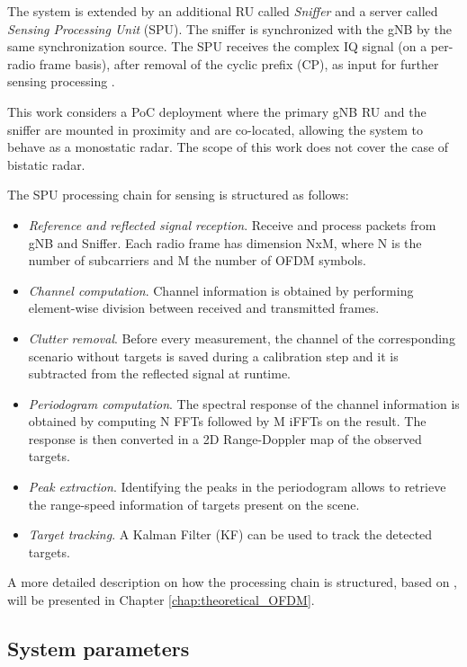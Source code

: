 	The system is extended by an additional RU called \textit{Sniffer} and a server called \textit{Sensing Processing Unit} (SPU). 
	The sniffer is synchronized with the gNB by the same synchronization source. 
	The SPU receives the complex IQ signal (on a per-radio frame basis),  after removal of the cyclic prefix (CP), as input for further sensing processing \cite{Wild_Grudnitsky_Mandelli_Henninger_Guan_Schaich_2023}.
	
	This work considers a PoC deployment where the primary gNB RU and the sniffer are mounted in proximity and are co-located, allowing the system to behave as a monostatic radar. 
	The scope of this work does not cover the case of bistatic radar.
	
	The SPU processing chain for sensing is structured as follows:
	
	\begin{itemize}
		\item \textit{Reference and reflected signal reception}. Receive and process packets from gNB and Sniffer. Each radio frame has dimension NxM, where N is the number of subcarriers and M the number of OFDM symbols.
		\item \textit{Channel computation}. Channel information is obtained by performing element-wise division between received and transmitted frames.
		\item \textit{Clutter removal}. Before every measurement, the channel of the corresponding scenario without targets is saved during a calibration step and it is subtracted from the reflected signal at runtime.
		\item \textit{Periodogram computation}. The spectral response of the channel information is obtained by computing N FFTs followed by M iFFTs on the result. The response is then converted in a 2D Range-Doppler map of the observed targets. 
		\item \textit{Peak extraction}. Identifying the peaks in the periodogram allows to retrieve the range-speed information of targets present on the scene.
		\item \textit{Target tracking}. A Kalman Filter (KF) can be used to track the detected targets. 
	\end{itemize} 
	A more detailed description on how the processing chain is structured,  based on \cite{Braun2014OFDMRA}, will be presented in Chapter \ref{chap:theoretical_OFDM}.
	
	
	\subsection{System parameters}
	
